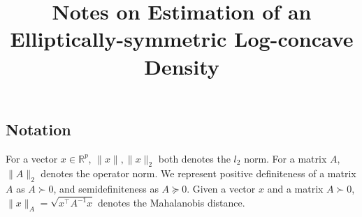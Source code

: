 \message{ !name(elliptical.tex)}\documentclass[12pt]{article}
\title{Notes on Estimation of an Elliptically-symmetric Log-concave Density}
\begin{document}

\subsection{Notation}

For a vector $x \in \mathbb{R}^p$, $\| x \|, \|x \|_2$ both denotes the $l_2$ norm. For a matrix $A$, $\| A \|_2$ denotes the operator norm. We represent positive definiteness of a matrix $A$ as $A \succ 0$, and semidefiniteness as $A \succeq 0$. Given a vector $x$ and a matrix $A \succ 0$, $\| x \|_A = \sqrt{ x^\top A^{-1} x }$ denotes the Mahalanobis distance.
\end{document}
